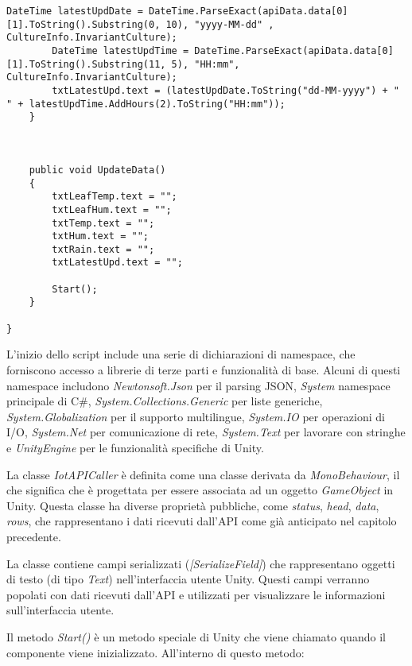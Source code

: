 \begin{lstlisting}[caption=Codice sorgente dello script \textit{IotAPICaller}, label=lst:IotAPICallerScript, captionpos=b, basicstyle=\scriptsize]
        DateTime latestUpdDate = DateTime.ParseExact(apiData.data[0][1].ToString().Substring(0, 10), "yyyy-MM-dd" , CultureInfo.InvariantCulture);
        DateTime latestUpdTime = DateTime.ParseExact(apiData.data[0][1].ToString().Substring(11, 5), "HH:mm", CultureInfo.InvariantCulture);
        txtLatestUpd.text = (latestUpdDate.ToString("dd-MM-yyyy") + " " + latestUpdTime.AddHours(2).ToString("HH:mm"));
    }
    
    
    
    public void UpdateData()
    {
        txtLeafTemp.text = "";
        txtLeafHum.text = "";
        txtTemp.text = "";
        txtHum.text = "";
        txtRain.text = "";
        txtLatestUpd.text = "";
        
        Start();
    }
   
}

\end{lstlisting}

L'inizio dello script include una serie di dichiarazioni di namespace, che forniscono accesso a librerie di terze parti e funzionalità di base. Alcuni di questi namespace includono \textit{Newtonsoft.Json} per il parsing JSON, \textit{System} namespace principale di C\#, \textit{System.Collections.Generic} per liste generiche, \textit{System.Globalization} per il supporto multilingue, \textit{System.IO} per operazioni di I/O, \textit{System.Net} per comunicazione di rete, \textit{System.Text} per lavorare con stringhe e \textit{UnityEngine} per le funzionalità specifiche di Unity.

La classe \textit{IotAPICaller} è definita come una classe derivata da \textit{MonoBehaviour}, il che significa che è progettata per essere associata ad un oggetto  \textit{GameObject} in Unity. Questa classe ha diverse proprietà pubbliche, come \textit{status}, \textit{head}, \textit{data}, \textit{rows}, che rappresentano i dati ricevuti dall'API come già anticipato nel capitolo precedente.

La classe contiene campi serializzati (\textit{[SerializeField]}) che rappresentano oggetti di testo (di tipo \textit{Text}) nell'interfaccia utente Unity. Questi campi verranno popolati con dati ricevuti dall'API e utilizzati per visualizzare le informazioni sull'interfaccia utente.

Il metodo \textit{Start()} è un metodo speciale di Unity che viene chiamato quando il componente viene inizializzato. All'interno di questo metodo:

